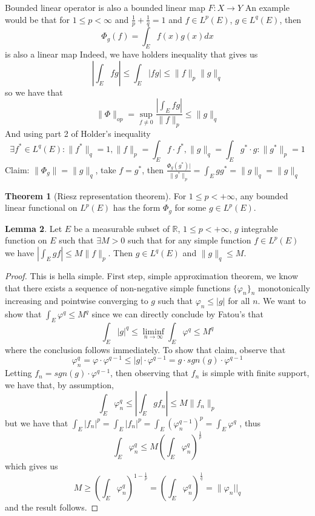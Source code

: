 \documentclass[13pt]{article}
\theoremstyle{definition} --- default
\newtheorem{theorem}{Theorem}
\newtheorem{lemma}[theorem]{Lemma}
\theoremstyle{definition}
\theoremstyle{remark}
\begin{document}
	Bounded linear operator is also a bounded linear map $F \colon X \to Y$
	An example would be that for $1 \leq p < \infty$ and $\frac{1}{p} + \frac{1}{q} = 1$ and $f \in L^p(E)$, $g \in L^q(E)$, then 
	$$\Phi_g(f) = \int_E f(x)g(x)dx$$ is also a linear map
	Indeed, we have holders inequality that gives us 
	$$ |\int_E fg | \leq \int_E |fg| \leq \|f\|_p \|g\|_q$$
	so we have that 
	$$ \|\Phi\|_{op} = \sup_{f \neq 0} \frac{| \int_E fg|}{\|f\|_p} \leq \|g\|_q$$
	And using part 2 of Holder's inequality 
	$$ \exists f^* \in L^q(E) \colon \|f^*\|_q = 1, \|f\|_p = \int_E f \cdot f^*, \|g\|_q = \int_E g^*\cdot g \colon \|g^*\|_p = 1$$
	Claim: $\|\Phi_g\| = \|g\|_q$, take $f = g^*$, then $\frac{\Phi_g(g^*)|}{\|g^*\|_p} = \int_E gg^* = \|g\|_q = \|g\|_q$
	\begin{theorem}[Riesz representation theorem]
		For $1 \leq p < + \infty$, any bounded linear functional on $L^p(E)$ has the form $\Phi_g$ for some $g \in L^p(E)$. 
		
	\end{theorem}
	\begin{lemma}
		Let $E$ be a measurable subset of $\mathbb{R}$, $1 \leq p < +\infty$, $g$ integrable function on $E$ such that $\exists M>0$ such that for any simple function $f \in L^p(E)$ we have $\left | \int_E gf \right| \leq M \|f\|_p$. Then $g \in L^q(E)$ and $\|g\|_q \leq M$. 
	\end{lemma}
	\begin{proof}
		This is hella simple. First step, simple approximation theorem, we know that there exists a sequence of non-negative simple functions $\{\varphi_n\}_{n}$ monotonically increasing and pointwise converging to $g$ such that $\varphi_n \leq |g|$ for all $n$. We want to show that $\int_E \varphi^q \leq M^q$ since we can directly conclude by Fatou's that
		$$ \int_E |g|^q \leq \liminf_{n \to \infty} \int_E \varphi^q \leq M^q $$
	where the conclusion follows immediately. To show that claim, observe that 
	$$ \varphi_n^q = \varphi \cdot \varphi^{q-1} \leq |g| \cdot \varphi^{q-1} = g \cdot sgn(g) \cdot \varphi^{q-1}$$
	Letting $f_n = sgn(g)\cdot \varphi^{q-1}$, then observing that $f_n$ is simple with finite support, we have that, by assumption,
	$$
	 	\int_E \varphi_n^q\leq \left | \int_E gf_n  \right| \leq M \|f_n\|_p
	$$
	but we have that $\int_E |f_n|^p = \int_E |f_n|^p = \int_E (\varphi_n^{q-1})^{p} = \int_E \varphi^q$
, thus 
$$ \int_E \varphi_n^q \leq M \left(\int_E \varphi_n^q\right)^{\frac{1}{p}}$$
which gives us
$$ M \geq \left(\int_E \varphi_n^q\right)^{1-\frac{1}{p}} = \left(\int_E \varphi^q_n \right)^{\frac{1}{q}} = \|\varphi_n||_q $$
and the result follows. 
	\end{proof}
\end{document}
